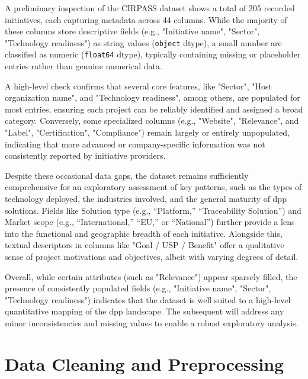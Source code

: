 A preliminary inspection of the CIRPASS dataset shows a total of 205 recorded initiatives, each capturing metadata across 44 columns. While the majority of these columns store descriptive fields (e.g., "Initiative name", "Sector", "Technology readiness") as string values (\verb|object| dtype), a small number are classified as numeric (\verb|float64| dtype), typically containing missing or placeholder entries rather than genuine numerical data.

A high-level check confirms that several core features, like "Sector", "Host organization name", and "Technology readiness", among others, are populated for most entries, ensuring each project can be reliably identified and assigned a broad category. Conversely, some specialized columns (e.g., "Website", "Relevance", and "Label", "Certification", "Compliance") remain largely or entirely unpopulated, indicating that more advanced or company-specific information was not consistently reported by initiative providers.

Despite these occasional data gaps, the dataset remains sufficiently comprehensive for an exploratory assessment of key patterns, such as the types of technology deployed, the industries involved, and the general maturity of \ac{dpp} solutions. Fields like Solution type (e.g., “Platform,” “Traceability Solution”) and Market scope (e.g., “International,” “EU,” or “National”) further provide a lens into the functional and geographic breadth of each initiative. Alongside this, textual descriptors in columns like "Goal / USP / Benefit" offer a qualitative sense of project motivations and objectives, albeit with varying degrees of detail.

Overall, while certain attributes (such as "Relevance") appear sparsely filled, the presence of consistently populated fields (e.g., "Initiative name", "Sector", "Technology readiness") indicates that the dataset is well suited to a high-level quantitative mapping of the \ac{dpp} landscape. The subsequent  will address any minor inconsistencies and missing values to enable a robust exploratory analysis.

\section{Data Cleaning and Preprocessing}
\label{sec:data_cleaning_preprocessing}

